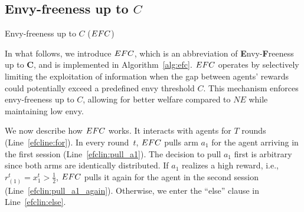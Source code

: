 \subsection{Envy-freeness up to $C$}\label{subsec:ext efc}
\begin{algorithm}[t]
\caption{Envy-freeness up to $C$ ($EFC$)}
\label{alg:efc}
\SetAlgoLined
\DontPrintSemicolon
\LinesNumbered
{}
\end{algorithm}

In what follows, we introduce $EFC$, which is an abbreviation of \textbf{E}nvy-\textbf{F}reeness up to $\textbf{C}$, and is
implemented in Algorithm~\ref{alg:efc}. $EFC$ operates by selectively limiting the exploitation of information when the gap between agents' rewards could potentially exceed a predefined envy threshold $C$. This mechanism enforces envy-freeness up to $C$, allowing for better welfare compared to $NE$ while maintaining low envy.

We now describe how $EFC$ works. It interacts with agents for $T$ rounds (Line~\ref{efcline:for}). In every round~$t$, $EFC$ pulls arm $a_1$ for the agent arriving in the first session (Line~\ref{efclin:pull_a1}). The decision to pull $a_1$ first is arbitrary since both arms are identically distributed. If $a_1$ realizes a high reward, i.e., $r^t_{(1)}=x^t_1 > \frac{1}{2}$, $EFC$ pulls it again for the agent in the second session (Line~\ref{efclin:pull_a1_again}). Otherwise, we enter the ``else'' clause in Line~\ref{efclin:else}.

